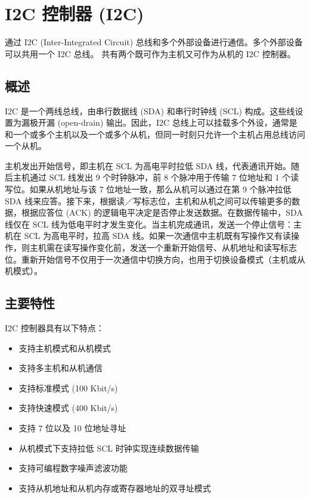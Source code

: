 \documentclass[main\_\_CN.tex]{subfiles}
\begin{document}

\ifglobal
\else
    {\let\clearpage\relax \listoftodos}
    {\let\clearpage\relax \listofdonetodos}
    \tableofcontents
\fi




\hypertarget{i2c}{}
\chapter{I2C 控制器 (I2C)}
\label{mod:i2c}

\chipname{} 通过 I2C (Inter-Integrated Circuit) 总线和多个外部设备进行通信。多个外部设备可以共用一个 I2C 总线。 
\chipname{} 共有两个既可作为主机又可作为从机的 I2C 控制器。


\section{概述}
I2C 是一个两线总线，由串行数据线 (SDA) 和串行时钟线 (SCL) 构成。这些线设置为漏极开漏 (open-drain) 输出。因此，I2C 总线上可以挂载多个外设，通常是和一个或多个主机以及一个或多个从机，但同一时刻只允许一个主机占用总线访问一个从机。

主机发出开始信号，即主机在 SCL 为高电平时拉低 SDA 线，代表通讯开始。随后主机通过 SCL 线发出 9 个时钟脉冲，前 8 个脉冲用于传输 7 位地址和 1 个读写位。如果从机地址与该 7 位地址一致，那么从机可以通过在第 9 个脉冲拉低 SDA 线来应答。接下来，根据读／写标志位，主机和从机之间可以传输更多的数据，根据应答位 (ACK) 的逻辑电平决定是否停止发送数据。在数据传输中，SDA 线仅在 SCL 线为低电平时才发生变化。当主机完成通讯，发送一个停止信号：主机在 SCL 为高电平时，拉高 SDA 线。如果一次通信中主机既有写操作又有读操作，则主机需在读写操作变化前，发送一个重新开始信号、从机地址和读写标志位。重新开始信号不仅用于一次通信中切换方向，也用于切换设备模式（主机或从机模式）。

\section{主要特性}

\chipname{} I2C 控制器具有以下特点：

\begin{itemize}
    \item 支持主机模式和从机模式
    \item 支持多主机和从机通信
    \item 支持标准模式 (100 Kbit/s)
    \item 支持快速模式 (400 Kbit/s)
    \item 支持 7 位以及 10 位地址寻址
    \item 从机模式下支持拉低 SCL 时钟实现连续数据传输
    \item 支持可编程数字噪声滤波功能
    \item 支持从机地址和从机内存或寄存器地址的双寻址模式
\end{itemize}
\end{document}
